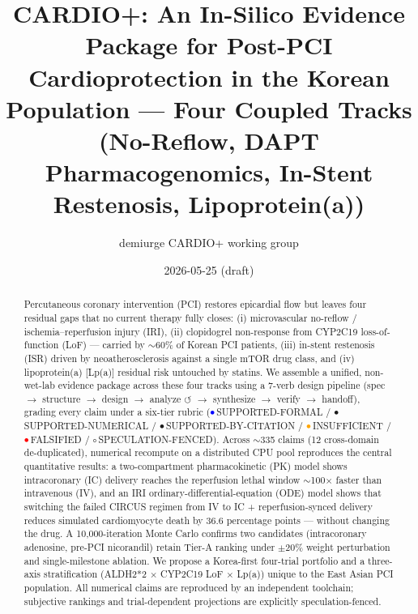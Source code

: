 \documentclass[11pt]{article}
\title{\textbf{CARDIO+: An In-Silico Evidence Package for Post-PCI Cardioprotection in the Korean Population --- Four Coupled Tracks (No-Reflow, DAPT Pharmacogenomics, In-Stent Restenosis, Lipoprotein(a))}}
\author[1]{demiurge CARDIO+ working group}
\affil[1]{hexa-native technical-design architecture (demiurge); verification via \texttt{hexa verify} (g5 rubric)}
\date{2026-05-25 (draft)}
\begin{document}
\maketitle

\begin{abstract}
Percutaneous coronary intervention (PCI) restores epicardial flow but leaves four residual gaps that no current therapy fully closes: (i) microvascular no-reflow / ischemia--reperfusion injury (IRI), (ii) clopidogrel non-response from CYP2C19 loss-of-function (LoF) --- carried by $\sim$60\% of Korean PCI patients, (iii) in-stent restenosis (ISR) driven by neoatherosclerosis against a single mTOR drug class, and (iv) lipoprotein(a) [Lp(a)] residual risk untouched by statins. We assemble a unified, non-wet-lab evidence package across these four tracks using a 7-verb design pipeline (spec $\rightarrow$ structure $\rightarrow$ design $\rightarrow$ analyze $\circlearrowleft$ $\rightarrow$ synthesize $\rightarrow$ verify $\rightarrow$ handoff), grading every claim under a six-tier rubric (\textcolor{blue}{$\bullet$}\,SUPPORTED-FORMAL / \textcolor{green!60!black}{$\bullet$}\,SUPPORTED-NUMERICAL / \textcolor{yellow!70!black}{$\bullet$}\,SUPPORTED-BY-CITATION / \textcolor{orange}{$\bullet$}\,INSUFFICIENT / \textcolor{red}{$\bullet$}\,FALSIFIED / $\circ$\,SPECULATION-FENCED). Across $\sim$335 claims (12 cross-domain de-duplicated), numerical recompute on a distributed CPU pool reproduces the central quantitative results: a two-compartment pharmacokinetic (PK) model shows intracoronary (IC) delivery reaches the reperfusion lethal window $\sim$100$\times$ faster than intravenous (IV), and an IRI ordinary-differential-equation (ODE) model shows that switching the failed CIRCUS regimen from IV to IC + reperfusion-synced delivery reduces simulated cardiomyocyte death by 36.6 percentage points --- without changing the drug. A 10{,}000-iteration Monte Carlo confirms two candidates (intracoronary adenosine, pre-PCI nicorandil) retain Tier-A ranking under $\pm$20\% weight perturbation and single-milestone ablation. We propose a Korea-first four-trial portfolio and a three-axis stratification (ALDH2*2 $\times$ CYP2C19 LoF $\times$ Lp(a)) unique to the East Asian PCI population. All numerical claims are reproduced by an independent toolchain; subjective rankings and trial-dependent projections are explicitly speculation-fenced.
\end{abstract}

\tableofcontents
\newpage

\end{document}
